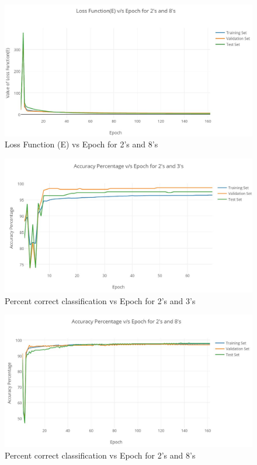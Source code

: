 \documentclass{article}
\begin{document}
\begin{figure}[h!]
  \centering
  \includegraphics[width=113mm]{graphs/4a_28.JPG}
  \caption{Loss Function (E) vs Epoch for 2's and 8's}
    \label{fig:graph 4(a)_28}
\end{figure}

\begin{figure}[h!]
  \centering
  \includegraphics[width=113mm]{graphs/4b_23.JPG}
  \caption{Percent correct classification vs Epoch for 2's and 3's}
  \label{fig4}
\end{figure}

\begin{figure}[h!]
  \centering
  \includegraphics[width=113mm]{graphs/4b_28.JPG}
  \caption{Percent correct classification vs Epoch for 2's and 8's}
  \label{fig5}
\end{figure}
\end{document}
